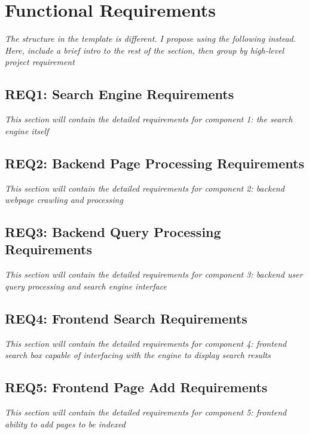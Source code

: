 \section{Functional Requirements}

\textit{The structure in the template is different. I propose using the following instead.} \\
\textit{Here, include a brief intro to the rest of the section, then group by high-level project requirement} \\

\subsection{REQ1: Search Engine Requirements}

\textit{This section will contain the detailed requirements for component 1: the search engine itself}

\subsection{REQ2: Backend Page Processing Requirements}

\textit{This section will contain the detailed requirements for component 2: backend webpage crawling and processing}

\subsection{REQ3: Backend Query Processing Requirements}

\textit{This section will contain the detailed requirements for component 3: backend user query processing and search engine interface}

\subsection{REQ4: Frontend Search Requirements}

\textit{This section will contain the detailed requirements for component 4: frontend search box capable of interfacing with the engine to display search results}

\subsection{REQ5: Frontend Page Add Requirements}

\textit{This section will contain the detailed requirements for component 5: frontend ability to add pages to be indexed}

